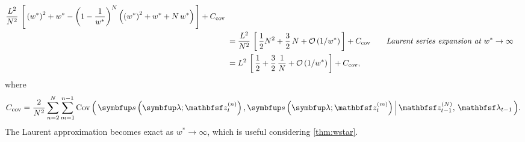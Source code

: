 \begin{proofEnd}
\begin{alignat}{2}
    \frac{L^2}{N^2} \,
    \left[\,
      {\left(w^*\right)}^2 + w^*
      -
      {\left(1 - \frac{1}{w^*}\right)}^N
      \left(
        {\left(w^*\right)}^2 + w^* + N\,w^*
      \right)
    \,\right]
    +
    C_{\text{cov}}
    \nonumber
    \\
    &\;=
    \frac{L^2}{N^2} \,
    \left[\,
    \frac{1}{2} N^2 + \frac{3}{2}\,N 
    + \mathcal{O}\left(1/w^*\right)
    \,\right]
    +
    C_{\text{cov}}
    \nonumber
    &&\quad\text{\textit{Laurent series expansion at \(w^* \rightarrow \infty\)}}
    \\
    &\;=
    L^2 \,
    \left[\,
    \frac{1}{2} + \frac{3}{2}\,\frac{1}{N}
    + \mathcal{O}\left(1/w^*\right)
    \,\right] + C_{\text{cov}},
    \nonumber
  \end{alignat}
  where \[
  C_\text{cov} = {\frac{2}{N^2} \sum^{N}_{n=2} \sum^{n-1}_{m = 1} \Cov{\vs\left(\vlambda; \rvvz^{(n)}_t\right), \vs\left(\vlambda; \rvvz^{(m)}_t\right) \,\middle|\, \rvvz_{t-1}^{(N)},\, \rvvlambda_{t-1} }}.\]
  The Laurent approximation becomes exact as \(w^* \rightarrow \infty\), which is useful considering \cref{thm:wstar}.
\end{proofEnd}

